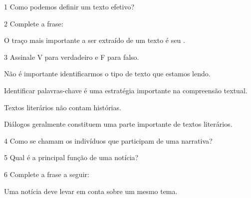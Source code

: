 
\num{1} Como podemos definir um texto efetivo?

\linhas[4]


\num{2} Complete a frase:

O traço mais importante a ser extraído de um texto é seu
\preencher.



\num{3} Assinale V para verdadeiro e F para falso.

\begin{boxlist}
\item Não é importante identificarmos o tipo de texto que estamos lendo. 

\item Identificar palavras-chave é uma estratégia importante na
compreensão textual. 

\item Textos literários não contam histórias. 

\item Diálogos geralmente constituem uma parte importante de textos
literários. 
\end{boxlist}

\num{4} Como se chamam os indivíduos que participam de uma narrativa?

\linhas[1]


\num{5} Qual é a principal função de uma notícia?

\linhas[2]


\num{6} Complete a frase a seguir:

Uma notícia deve levar em conta \preencher sobre um mesmo tema.



